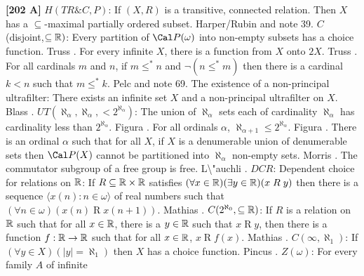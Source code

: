\smallskip
\item{}{\bf [202 A]}  $H(TR\&C,P)$:  If $(X,R)$ is a transitive, connected
relation. Then $X$ has a $\subseteq $-maximal partially ordered subset.
\ac{Harper/Rubin} \cite{1976} and note 39.
\medskip
{} $C$(disjoint,$\subseteq\Bbb R)$: Every partition of
${\Cal P}(\omega)$ into non-empty subsets has a choice function. \ac{Truss}
\cite{1978}.
\medskip
{}  For every infinite $X$, there is a
function from $X$ onto $2X$.  \ac{Truss} \cite{1978}.
\medskip
{} For all cardinals $m$ and $n$, if $m\le^* n$ and
$\neg (n\le^* m)$ then there is a cardinal $k<n$ such that $m\le^* k$.
\ac{Pelc} \cite{1978} and note 69.
\medskip
{} The existence of a non-principal ultrafilter: There
exists an infinite set $X$ and a non-principal ultrafilter on $X$.
\ac{Blass} \cite{1977b}.
\medskip
{} $UT(\aleph_{\alpha },\aleph_{\alpha},
<2^{\aleph_{\alpha }})$: The union of $\aleph_{\alpha}$ sets each of
cardinality $\aleph_{\alpha}$ has cardinality less than
$2^{\aleph_{\alpha}}$.  \ac{Figura} \cite{1977}.
\medskip
{} For all ordinals $\alpha$, $\aleph_{\alpha+1}\le
2^{\aleph_\alpha}$.  \ac{Figura} \cite{1977}.
\medskip
{} There is an ordinal $\alpha$ such that for all
$X$, if $X$ is a denumerable union of denumerable sets then ${\Cal P}(X)$
cannot be partitioned into $\aleph_{\alpha}$ non-empty sets. \ac{Morris}
\cite{1970}.
\medskip
{}  The commutator subgroup of a free group is free.
\ac{L\"auchli} \cite{1962}.
\medskip
{} $DCR$: Dependent choice for relations on
$\Bbb R$: If $R\subseteq\Bbb R\times\Bbb R$ satisfies $(\forall x\in
\Bbb R)(\exists y\in\Bbb R)(x\mathrel R y)$ then there is a sequence
$\langle x(n): n\in\omega\rangle$ of real numbers such that
$(\forall n\in\omega)(x(n)\mathrel R x(n+1))$. \ac{Mathias} \cite{1977a}.
\medskip
{} $C(2^{\aleph_{0}},\subseteq{\Bbb R})$: If $R$ is a
relation on ${\Bbb R}$ such that for all $x\in{\Bbb R}$, there is a
$y\in{\Bbb R}$ such that $x\mathrel R y$, then there is a function
$f: {\Bbb R} \rightarrow{\Bbb R}$ such that for all $x\in{\Bbb R}$,
$x\mathrel R f(x)$.  \ac{Mathias} \cite{1977a}.
\medskip
{} $C(\infty,\aleph_{1})$: If $(\forall y\in X)(|y|
= \aleph_{1})$ then $X$ has a choice function.  \ac{Pincus} \cite{1977a}.
\medskip
{} $Z(\omega)$: For every family $A$ of infinite
